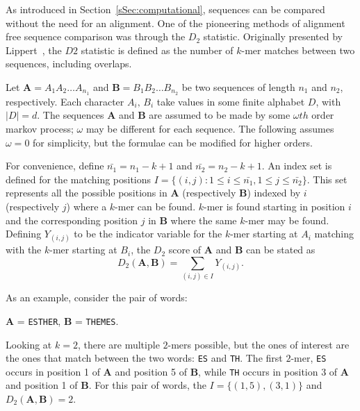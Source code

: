 



As introduced in Section~\ref{sSec:computational}, sequences can be compared without the need for an alignment. 
One of the pioneering methods of alignment free sequence comparison was through the $D_2$ statistic. Originally presented by Lippert~\cite{lippert2002distributional}, the $D2$ statistic is defined as the number of $k$-mer matches between two sequences, including overlaps.


Let $\mathbf{A} = A_1A_2\ldots A_{n_1}$ and $\mathbf{B}=B_1B_2\ldots B_{n_2}$ be two sequences of length $n_1$ and $n_2$, respectively. Each character $A_i,\,B_i$ take values in some finite alphabet $D$, with $|D| = d$.  The sequences $\mathbf{A}$ and $\mathbf{B}$ are assumed to be made by some $\omega th$ order markov process; $\omega$ may be different for each sequence. The following assumes $\omega = 0$ for simplicity, but the formulae can be modified for higher orders. 

For convenience, define $\bar{n_1} = n_1 - k + 1$ and $\bar{n_2} = n_2 - k + 1$. An index set is defined for the matching positions $I = \{(i,j): 1 \leq i \leq \bar{n_1}, 1 \leq j \leq \bar{n_2}\}$. This set represents all the possible positions in $\mathbf{A}$ (respectively $\mathbf{B}$) indexed by $i$ (respectively $j$) where a $k$-mer can be found. 
 $k$-mer is found starting in position $i$ and the corresponding position $j$ in $\mathbf{B}$ where the same $k$-mer may be found. 
Defining $Y_{(i,j)}$ to be the indicator variable for the $k$-mer starting at $A_i$ matching with the $k$-mer starting at $B_i$, the $D_2$ score of $\mathbf{A}$ and $\mathbf{B}$ can be stated as 
	\begin{equation}
		D_2(\textbf{A},\textbf{B}) = \sum_{(i,j)\in I }Y_{(i,j)}.\label{eqn:AF}
	\end{equation}

As an example, consider the pair of words: 
\begin{center}
    \textbf{A} = \texttt{ESTHER}, \hspace{0.2\textwidth} \textbf{B} = \texttt{THEMES}.
\end{center}
Looking at $k = 2$, there are multiple $2$-mers possible, but the ones of interest are the ones that match between the two words: \texttt{ES} and \texttt{TH}. The first $2$-mer, \texttt{ES} occurs in position 1 of \textbf{A} and position 5 of \textbf{B}, while \texttt{TH} occurs in position 3 of \textbf{A} and position 1 of \textbf{B}. For this pair of words, the $I = \{(1,5),(3,1)\}$ and $D_2(\textbf{A},\textbf{B}) = 2$. 

